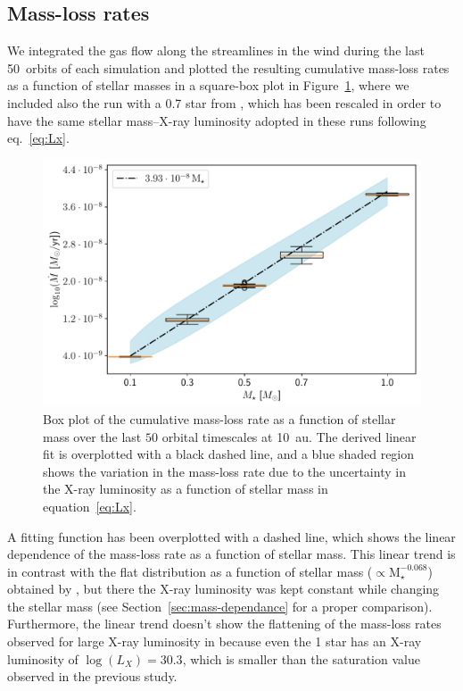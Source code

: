 \documentclass[usenatbib,useAMS,usedcolumn]{mnras}
\begin{document}
\subsection{Mass-loss rates}\label{sec:mdot}
We integrated the gas flow along the streamlines in the wind during the last \SI{50}{orbits} of each simulation and plotted the resulting cumulative mass-loss rates as a function of stellar masses in a square-box plot in Figure~\ref{fig:Mdot}, where we included also the run with a \SI{0.7}{\solarmass} star from , which has been rescaled in order to have the same stellar mass--X-ray luminosity adopted in these runs following eq.~\ref{eq:Lx}.
\begin{figure}
  \includegraphics[width=\columnwidth]{Figure6}
  \caption{Box plot of the cumulative mass-loss rate as a function of stellar mass over the last $50$ orbital timescales at \SI{10}{\astronomicalunit}. The derived linear fit is overplotted with a black dashed line, and a blue shaded region shows the variation in the mass-loss rate due to the uncertainty in the X-ray luminosity as a function of stellar mass in equation~\ref{eq:Lx}. \label{fig:Mdot}}
\end{figure}
A fitting function has been overplotted with a dashed line, which shows the linear dependence of the mass-loss rate as a function of stellar mass. This linear trend is in contrast with the flat distribution as a function of stellar mass ($\propto \mathrm{M}_\star^{-0.068}$) obtained by , but there the X-ray luminosity was kept constant while changing the stellar mass (see Section~\ref{sec:mass-dependance} for a proper comparison). Furthermore, the linear trend doesn't show the flattening of the mass-loss rates observed for large X-ray luminosity in  because even the \SI{1}{\solarmass} star has an X-ray luminosity of $\log(L_X) = 30.3$, which is smaller than the saturation value observed in the previous study.
\end{document}
